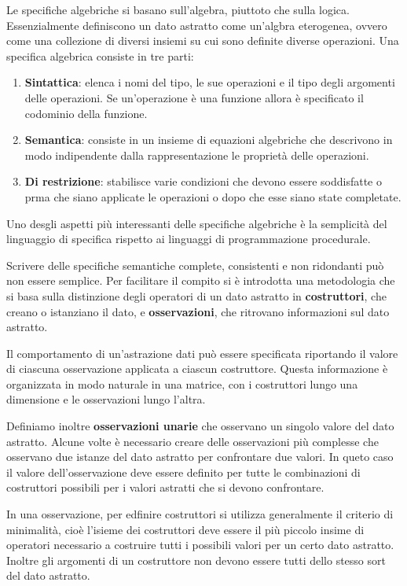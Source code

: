 \documentclass[a4paper,18pt]{extarticle}
\begin{document}
 Le specifiche algebriche si basano sull'algebra, piuttoto che sulla logica. Essenzialmente definiscono un dato astratto come un'algbra eterogenea, ovvero come una collezione di diversi insiemi su cui sono definite diverse operazioni. Una specifica algebrica consiste in tre parti:
 
 \begin{enumerate}
    \item \textbf{Sintattica}: elenca i nomi del tipo, le sue operazioni e il tipo degli argomenti delle operazioni. Se un'operazione è una funzione allora è specificato il codominio della funzione.
    \item \textbf{Semantica}: consiste in un insieme di equazioni algebriche che descrivono in modo indipendente dalla rappresentazione le proprietà delle operazioni.
    \item \textbf{Di restrizione}: stabilisce varie condizioni che devono essere soddisfatte o prma che siano applicate le operazioni o dopo che esse siano state completate.
\end{enumerate}

Uno desgli aspetti più interessanti delle specifiche algebriche è la semplicità del linguaggio di specifica rispetto ai linguaggi di programmazione procedurale.

Scrivere delle specifiche semantiche complete, consistenti e non ridondanti può non essere semplice. Per facilitare il compito si è introdotta una metodologia che si basa sulla distinzione degli operatori di un dato astratto in \textbf{costruttori}, che creano o istanziano il dato, e \textbf{osservazioni}, che ritrovano informazioni sul dato astratto.

Il comportamento di un'astrazione dati può essere specificata riportando il valore di ciascuna osservazione applicata a ciascun costruttore. Questa informazione è organizzata in modo naturale in una matrice, con i costruttori lungo una dimensione e le osservazioni lungo l'altra.

Definiamo inoltre \textbf{osservazioni unarie} che osservano un singolo valore del dato astratto. Alcune volte è necessario creare delle osservazioni più complesse che osservano due istanze del dato astratto per confrontare due valori. In queto caso il valore dell'osservazione deve essere definito per tutte le combinazioni di costruttori possibili per i valori astratti che si devono confrontare.

In una osservazione, per edfinire  costruttori si utilizza generalmente il criterio di minimalità, cioè l'isieme dei costruttori deve essere il più piccolo insime di operatori necessario a costruire tutti i possibili valori per un certo dato astratto. Inoltre gli argomenti di un costruttore non devono essere tutti dello stesso sort del dato astratto.
\end{document}
